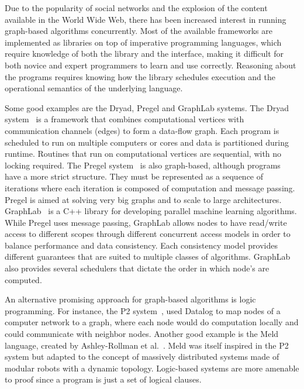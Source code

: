 
Due to the popularity of social networks and the explosion of the content available in the World Wide Web, there has been
increased interest in running graph-based algorithms concurrently. Most of the available frameworks are implemented as libraries on top
of imperative programming languages, which require knowledge of both the library and the interface, making it difficult
for both novice and expert programmers to learn and use correctly.
Reasoning about the programs requires knowing how
the library schedules execution and the operational semantics of the underlying language.

Some good examples are the Dryad, Pregel and GraphLab systems.
The Dryad system~\cite{Isard:2007:DDD:1272996.1273005} is a framework that combines computational vertices
with communication channels (edges) to form a data-flow graph. Each program is scheduled to
run on multiple computers or cores and data is partitioned during runtime. Routines that run on computational vertices
are sequential, with no locking required.
The Pregel system~\cite{Malewicz:2010:PSL:1807167.1807184} is also graph-based, although programs have a more strict
structure. They must be represented as a sequence of iterations where each iteration is composed of computation and message passing.
Pregel is aimed at solving very big graphs
and to scale to large architectures. GraphLab~\cite{GraphLab2010} is a C++ library for developing parallel machine learning algorithms. While
Pregel uses message passing, GraphLab allows nodes to have read/write access to different scopes through different concurrent access models in order to balance performance and data consistency. Each consistency model provides different guarantees that are suited to multiple classes of algorithms. GraphLab also provides several schedulers that dictate the order in which node's are computed.

An alternative promising approach for graph-based algorithms 
is logic programming. For instance, the P2 system~\cite{Loo-condie-garofalakis-p2}, used Datalog to map nodes of a computer network
to a graph, where each node would do computation locally and could communicate with neighbor nodes.
Another good example is the Meld language, created by
Ashley-Rollman et al.~\cite{ashley-rollman-derosa-iros07wksp,ashley-rollman-iclp09}.
Meld was itself inspired in the P2 system but adapted to the concept of massively distributed systems made of modular robots with a
dynamic topology.
Logic-based systems are more amenable to proof since a program is just a set of logical clauses.

